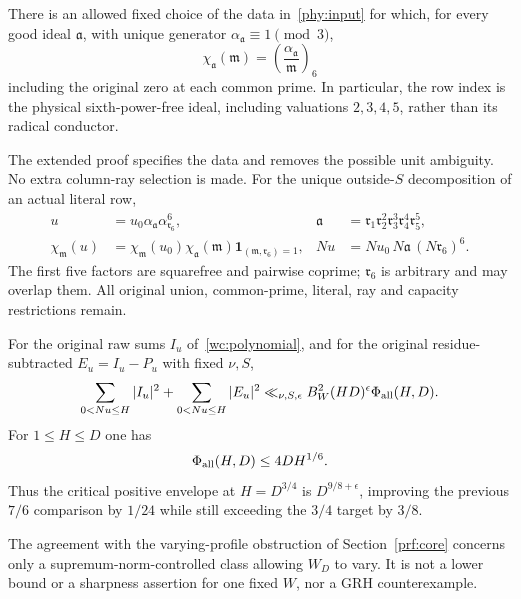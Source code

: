 \begin{proposition}\label{phy:family}
There is an allowed fixed choice of the data in~\eqref{phy:input}
for which, for every good ideal $\mathfrak a$, with unique generator
$\alpha_{\mathfrak a}\equiv1\pmod3$,
\[
 \chi_{\mathfrak a}(\mathfrak m)
       =\left(\frac{\alpha_{\mathfrak a}}{\mathfrak m}\right)_6
\]
including the original zero at each common prime.
In particular, the row index is the physical sixth-power-free ideal,
including valuations $2,3,4,5$, rather than its radical conductor.
\end{proposition}
The extended proof specifies the data and removes the possible unit
ambiguity. No extra column-ray selection is made.
For the unique outside-$S$ decomposition of an actual literal row,
\begin{equation}\label{phy:raw}
 \begin{aligned}
 u&=u_0\alpha_{\mathfrak a}\alpha_{\mathfrak r_6}^6,
 &\mathfrak a&=\mathfrak r_1\mathfrak r_2^2
              \mathfrak r_3^3\mathfrak r_4^4\mathfrak r_5^5,\\
 \chi_{\mathfrak m}(u)
   &=\chi_{\mathfrak m}(u_0)\chi_{\mathfrak a}(\mathfrak m)
                  \mathbf1_{(\mathfrak m,\mathfrak r_6)=1},
 &Nu&=Nu_0\,N\mathfrak a\,(N\mathfrak r_6)^6.
 \end{aligned}
\end{equation}
The first five factors are squarefree and pairwise coprime;
$\mathfrak r_6$ is arbitrary and may overlap them. All original
union, common-prime, literal, ray and capacity restrictions remain.

\begin{proposition}\label{phy:global}
For the original raw sums $I_u$ of~\eqref{wc:polynomial}, and for
the original residue-subtracted $E_u=I_u-P_u$ with fixed $\nu,S$,
\[
 \sum_{0<Nu\le H}|I_u|^2+\sum_{0<Nu\le H}|E_u|^2
 \ll_{\nu,S,\epsilon}B_W^2(HD)^\epsilon\Phi_{\rm all}(H,D).
\]
For $1\le H\le D$ one has
\begin{equation}\label{phy:dominance}
 \Phi_{\rm all}(H,D)\le4DH^{1/6}.
\end{equation}
Thus the critical positive envelope at $H=D^{3/4}$ is $D^{9/8+\epsilon}$,
improving the previous $7/6$ comparison by $1/24$ while still exceeding
the $3/4$ target by $3/8$.
\end{proposition}
The agreement with the varying-profile obstruction of
Section~\ref{prf:core} concerns only a supremum-norm-controlled class
allowing $W_D$ to vary. It is not a lower bound or a sharpness assertion
for one fixed $W$, nor a GRH counterexample.

